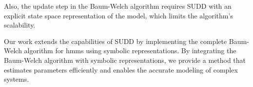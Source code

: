 Also, the update step in the Baum-Welch algorithm requires SUDD with an explicit state space representation of the model, which limits the algorithm's scalability.

Our work extends the capabilities of SUDD by implementing the complete Baum-Welch algorithm for \glspl{hmm} using symbolic representations.
By integrating the Baum-Welch algorithm with symbolic representations, we provide a method that estimates parameters efficiently and enables the accurate modeling of complex systems.













